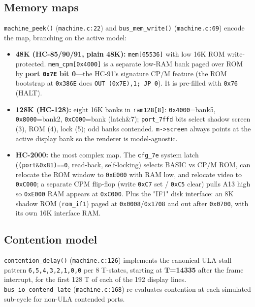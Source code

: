 \documentclass[11pt,a4paper]{article}
\begin{document}
\subsection{Memory maps}
\texttt{machine\_peek()} (\texttt{machine.c:22}) and \texttt{bus\_mem\_write()}
(\texttt{machine.c:69}) encode the map, branching on the active model:

\begin{itemize}
\item \textbf{48K (HC-85/90/91, plain 48K):} \texttt{mem[65536]} with low 16K ROM
      write-protected. \texttt{mem\_cpm[0x4000]} is a separate low-RAM bank
      paged over ROM by \textbf{port \texttt{0x7E} bit 0}---the HC-91's
      signature CP/M feature (the ROM bootstrap at \texttt{0x386E} does
      \texttt{OUT (0x7E),1; JP 0}). It is pre-filled with \texttt{0x76} (HALT).
\item \textbf{128K (HC-128):} eight 16K banks in \texttt{ram128[8]}:
      \texttt{0x4000}=bank5, \texttt{0x8000}=bank2, \texttt{0xC000}=bank
      (latch\&7); \texttt{port\_7ffd} bits select shadow screen (3), ROM (4),
      lock (5); odd banks contended. \texttt{m->screen} always points at the
      active display bank so the renderer is model-agnostic.
\item \textbf{HC-2000:} the most complex map. The \texttt{cfg\_7e} system latch
      (\texttt{(port\&0x81)==0}, read-back, self-locking) selects BASIC vs CP/M
      ROM, can relocate the ROM window to \texttt{0xE000} with RAM low, and
      relocate video to \texttt{0xC000}; a separate CPM flip-flop (write
      \texttt{0xC7} set / \texttt{0xC5} clear) pulls A13 high so
      \texttt{0xE000} RAM appears at \texttt{0xC000}. Plus the "IF1" disk
      interface: an 8K shadow ROM (\texttt{rom\_if1}) paged at
      \texttt{0x0008}/\texttt{0x1708} and out after \texttt{0x0700}, with its own
      16K interface RAM.
\end{itemize}

\subsection{Contention model}
\texttt{contention\_delay()} (\texttt{machine.c:126}) implements the canonical
ULA stall pattern \texttt{6,5,4,3,2,1,0,0} per 8 T-states, starting at
\textbf{T=14335} after the frame interrupt, for the first 128 T of each of the
192 display lines. \texttt{bus\_io\_contend\_late} (\texttt{machine.c:168})
re-evaluates contention at each simulated sub-cycle for non-ULA contended ports.
\end{document}
